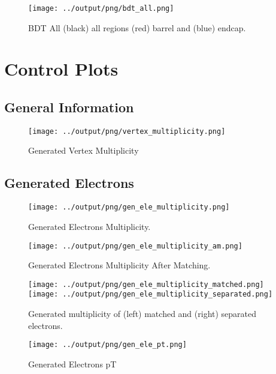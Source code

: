 \documentclass[11pt]{book}
\begin{document}
\begin{figure}[htb]
\centering
\texttt{[image: ../output/png/bdt\_all.png]}
\caption{BDT All (black) all regions (red) barrel and (blue) endcap.}
\label{fig:bdt_all}
\end{figure}

\clearpage

\chapter{Control Plots}
\section{General Information}
\begin{figure}[htb]
\centering
\texttt{[image: ../output/png/vertex\_multiplicity.png]}
\caption{Generated Vertex Multiplicity}
\label{fig:vertex_multiplicity}
\end{figure}
\clearpage
\clearpage

\section{Generated Electrons}

\begin{figure}[htb]
\centering
\texttt{[image: ../output/png/gen\_ele\_multiplicity.png]}
\caption{Generated Electrons Multiplicity.}
\label{fig:gen_ele_multiplicity}
\end{figure}

\begin{figure}[htb]
\centering
\texttt{[image: ../output/png/gen\_ele\_multiplicity\_am.png]}
\caption{Generated Electrons Multiplicity After Matching.}
\label{fig:gen_ele_multiplicity_am}
\end{figure}


\begin{figure}[htb]
\centering
\texttt{[image: ../output/png/gen\_ele\_multiplicity\_matched.png]}
\texttt{[image: ../output/png/gen\_ele\_multiplicity\_separated.png]}
\caption{Generated multiplicity of (left) matched and (right) separated electrons.}
\label{fig:gn_ele_mat_sep}
\end{figure}

\begin{figure}[htb]
\centering
\texttt{[image: ../output/png/gen\_ele\_pt.png]}
\caption{Generated Electrons pT}
\label{fig:gen_ele_pt}
\end{figure}
\clearpage
\end{document}
